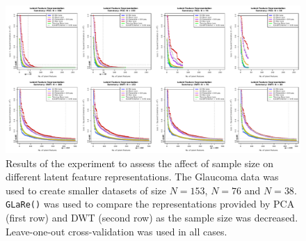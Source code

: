 \begin{figure}
    \centering
    \includegraphics[width=1\linewidth]{figures/eye-sample-size-results-results-01.pdf}
    \caption{Results of the experiment to assess the affect of sample size on different latent feature representations. The Glaucoma data was used to create smaller datasets of size $N=153$, $N=76$ and $N=38$. \texttt{GLaRe()} was used to compare the representations provided by PCA (first row) and DWT (second row) as the sample size was decreased. Leave-one-out cross-validation was used in all cases.}
    \label{fig:eye-sample-size-results-results-01}
\end{figure}


